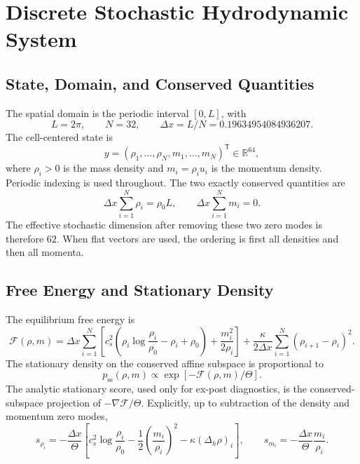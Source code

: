 \documentclass[11pt]{article}
\newcommand{\RR}{\mathbb{R}}
\newcommand{\transpose}{\mathsf T}
\begin{document}
\section{Discrete Stochastic Hydrodynamic System}

\subsection{State, Domain, and Conserved Quantities}

The spatial domain is the periodic interval \([0,L]\), with
\begin{equation}
    L=2\pi,\qquad N=32,\qquad \Delta x=L/N=0.19634954084936207.
\end{equation}
The cell-centered state is
\begin{equation}
    y=(\rho_1,\ldots,\rho_N,m_1,\ldots,m_N)^\transpose\in\RR^{64},
\end{equation}
where \(\rho_i>0\) is the mass density and \(m_i=\rho_i u_i\) is the momentum density.  Periodic indexing is used throughout.  The two exactly conserved quantities are
\begin{equation}
    \Delta x\sum_{i=1}^N \rho_i=\rho_0L,
    \qquad
    \Delta x\sum_{i=1}^N m_i=0.
\end{equation}
The effective stochastic dimension after removing these two zero modes is therefore \(62\).  When flat vectors are used, the ordering is first all densities and then all momenta.

\subsection{Free Energy and Stationary Density}

The equilibrium free energy is
\begin{equation}
    \mathcal F(\rho,m)
    =
    \Delta x\sum_{i=1}^{N}
    \left[
        c_s^2
        \left(
            \rho_i\log\frac{\rho_i}{\rho_0}
            -\rho_i+\rho_0
        \right)
        +
        \frac{m_i^2}{2\rho_i}
    \right]
    +
    \frac{\kappa}{2\Delta x}
    \sum_{i=1}^{N}(\rho_{i+1}-\rho_i)^2 .
    \label{eq:free_energy}
\end{equation}
The stationary density on the conserved affine subspace is proportional to
\begin{equation}
    p_{\mathrm{ss}}(\rho,m)\propto
    \exp[-\mathcal F(\rho,m)/\Theta].
\end{equation}
The analytic stationary score, used only for ex-post diagnostics, is the conserved-subspace projection of \(-\nabla\mathcal F/\Theta\).  Explicitly, up to subtraction of the density and momentum zero modes,
\begin{equation}
    s_{\rho_i}
    =
    -\frac{\Delta x}{\Theta}
    \left[
        c_s^2\log\frac{\rho_i}{\rho_0}
        -
        \frac{1}{2}\left(\frac{m_i}{\rho_i}\right)^2
        -
        \kappa(\Delta_h\rho)_i
    \right],
    \qquad
    s_{m_i}
    =
    -\frac{\Delta x}{\Theta}\frac{m_i}{\rho_i}.
    \label{eq:analytic_score}
\end{equation}
\end{document}
